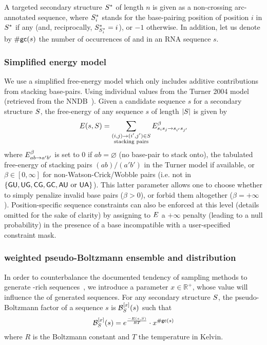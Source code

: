 A targeted secondary structure ${S}^*$ of length $n$ is given as a non-crossing arc-annotated sequence,  where 
${S}^*_i$ stands for the base-pairing position of position $i$ in ${S}^*$ if any (and, reciprocally, ${S}^*_{{S}^*_i}=i$), or $-1$ otherwise. 
In addition, let us denote by ${\#\text{{\sf gc}}}(s)$ the number of occurrences of \Gb and \Cb in an RNA sequence $s$.

\subsubsection{Simplified energy model}
We use a simplified free-energy model which only includes additive contributions from stacking base-pairs. Using individual values from the Turner 2004 model (retrieved from the NNDB~\cite{Turner2010}). Given a candidate sequence $s$ for a secondary structure ${S}$, the free-energy of any sequence $s$ of length $|{S}|$  is given by
\begin{align*}
  {{E}}(s,{S}) = \sum_{\substack{(i,j)\to (i',j')\in {S}\\ \text{stacking pairs}}}{{E}}^{\beta}_{s_is_j\to s_{i'}s_{j'}} 
\end{align*}
where ${{E}}^{\beta}_{ab\to a'b'}$ is set to $0$ if $ab=\varnothing$ (no base-pair to stack onto), the tabulated free-energy of stacking pairs $(ab)/(a'b')$ in the Turner model if available, or $\beta\in[0,\infty]$ for non-Watson-Crick/Wobble pairs (i.e. not in $\{{\sf{G}}{\sf{U}},{\sf{U}}{\sf{G}},{\sf{C}}{\sf{G}},{\sf{G}}{\sf{C}}, {\sf{A}}{\sf{U}}\text{ or }{\sf{U}}{\sf{A}}\}$). This latter parameter allows one to choose whether to simply penalize invalid base pairs ($\beta>0$), or forbid them altogether ($\beta = +\infty$). 
Position-specific sequence constraints can also be enforced at this level (details omitted for the sake of clarity) by assigning to ${{E}}$ a $+\infty$ penalty (leading to a null probability) in the presence of a base incompatible with a user-specified constraint mask.


\subsubsection{\GCContent weighted pseudo-Boltzmann ensemble and distribution}

In order to counterbalance the documented tendency of sampling methods to generate \Gb\Cb-rich sequences~\cite{Levin:2012kx}, we introduce a parameter $x\in\mathbb{R}^+$, whose value will influence the \GCContent of generated sequences. For any secondary structure ${S}$, the pseudo-Boltzmann factor of a sequence $s$ is $\mathcal{B}^{[x]}_{{S}}(s)$  such that
\begin{equation}
\mathcal{B}_{{S}}^{[x]}(s) = e^{\frac{-{{E}}(s,{S})}{RT}}\cdot x^{{\#\text{{\sf gc}}}(s)}
\label{def:genBoltz}
\end{equation}
where $R$ is the Boltzmann constant and $T$ the temperature in Kelvin.

